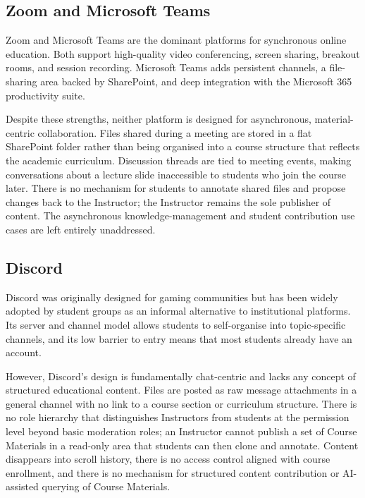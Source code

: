 \subsection{Zoom and Microsoft Teams}
\label{subsec:zoom-teams}

Zoom and Microsoft Teams are the dominant platforms for synchronous online education. Both support
high-quality video conferencing, screen sharing, breakout rooms, and session recording. Microsoft
Teams adds persistent channels, a file-sharing area backed by SharePoint, and deep integration
with the Microsoft 365 productivity suite.

Despite these strengths, neither platform is designed for asynchronous, material-centric
collaboration. Files shared during a meeting are stored in a flat SharePoint folder rather than
being organised into a course structure that reflects the academic curriculum. Discussion threads
are tied to meeting events, making conversations about a lecture slide inaccessible to students
who join the course later. There is no mechanism for students to annotate shared files and propose
changes back to the Instructor; the Instructor remains the sole publisher of content. The
asynchronous knowledge-management and student contribution use cases are left entirely unaddressed.

\subsection{Discord}
\label{subsec:discord}

Discord was originally designed for gaming communities but has been widely adopted by student
groups as an informal alternative to institutional platforms. Its server and channel model allows
students to self-organise into topic-specific channels, and its low barrier to entry means that
most students already have an account.

However, Discord's design is fundamentally chat-centric and lacks any concept of structured
educational content. Files are posted as raw message attachments in a general channel with no link
to a course section or curriculum structure. There is no role hierarchy that distinguishes
Instructors from students at the permission level beyond basic moderation roles; an Instructor
cannot publish a set of Course Materials in a read-only area that students can then clone and
annotate. Content disappears into scroll history, there is no access control aligned with course
enrollment, and there is no mechanism for structured content contribution or AI-assisted querying
of Course Materials.

